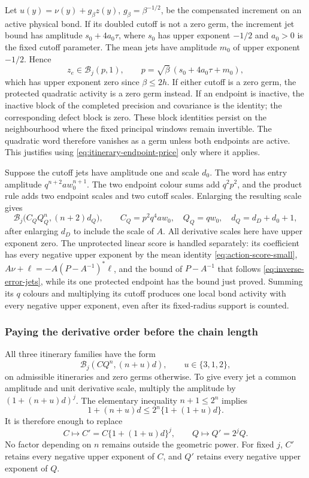 Let $u(y)=\nu(y)+g_\beta z(y)$, $g_\beta=\beta^{-1/2}$,
be the compensated increment on an active physical bond.
If its doubled cutoff is not a zero germ, the increment jet bound
has amplitude $s_0+4a_0\tau$, where $s_0$ has upper exponent
$-1/2$ and $a_0>0$ is the fixed cutoff parameter. The mean jets
have amplitude $m_0$ of upper exponent $-1/2$. Hence
\begin{equation}\label{eq:itinerary-endpoint-price}
 z_e\in\mathcal B_j(p,1),\qquad
 p=\sqrt\beta\,(s_0+4a_0\tau+m_0),
\end{equation}
which has upper exponent zero since $\beta\le2h$.
If either cutoff is a zero germ, the protected quadratic activity
is a zero germ instead. If an endpoint is inactive, the inactive
block of the completed precision and covariance is the identity;
the corresponding defect block is zero. These block identities
persist on the neighbourhood where the fixed principal windows
remain invertible. The quadratic word therefore vanishes as a
germ unless both endpoints are active. This justifies using
\eqref{eq:itinerary-endpoint-price} only where it applies.

Suppose the cutoff jets have amplitude one and scale $d_0$.
The word has entry amplitude $q^{n+2}aw_0^{n+1}$.
The two endpoint colour sums add $q^2p^2$, and the product
rule adds two endpoint scales and two cutoff scales. Enlarging
the resulting scale gives
\begin{equation}\label{eq:itinerary-quadratic-price}
 \mathcal B_j\bigl(C_Q Q_Q^n,(n+2)d_Q\bigr),\qquad
 C_Q=p^2q^4aw_0,\quad Q_Q=qw_0,\quad
 d_Q=d_D+d_0+1,
\end{equation}
after enlarging $d_D$ to include the scale of $A$.
All derivative scales here have upper exponent zero. The
unprotected linear score is handled separately: its coefficient
has every negative upper exponent by the mean identity
\eqref{eq:action-score-small}, $A\nu+\ell=-A(P-A^{-1})^*\ell$, and
the bound of $P-A^{-1}$ that follows \eqref{eq:inverse-error-jets}, while
its one protected endpoint has the bound just proved. Summing
its $q$ colours and multiplying its cutoff produces one local
bond activity with every negative upper exponent, even after
its fixed-radius support is counted.

\subsubsection{Paying the derivative order before the chain length}
All three itinerary families have the form
\[
 \mathcal B_j(CQ^n,(n+u)d),\qquad u\in\{3,1,2\},
\]
on admissible itineraries and zero germs otherwise. To give every
jet a common amplitude and unit derivative scale, multiply the
amplitude by $(1+(n+u)d)^j$. The elementary inequality
$n+1\le2^n$ implies
\[
 1+(n+u)d\le2^n\{1+(1+u)d\}.
\]
It is therefore enough to replace
\begin{equation}\label{eq:itinerary-inflated-price}
 C\longmapsto C'=C\{1+(1+u)d\}^{j},\qquad
 Q\longmapsto Q'=2^jQ.
\end{equation}
No factor depending on $n$ remains outside the geometric power.
For fixed $j$, $C'$ retains every negative upper exponent of $C$,
and $Q'$ retains every negative upper exponent of $Q$.

